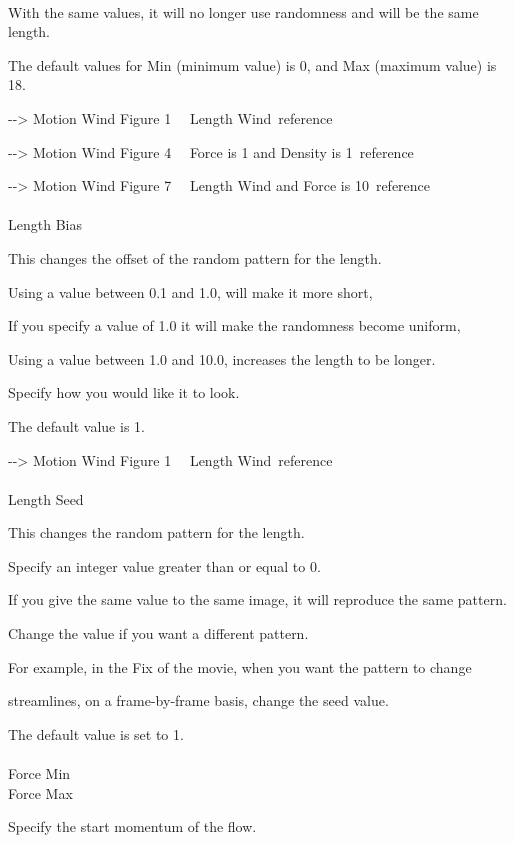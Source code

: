 \documentclass[a4paper,12pt]{article}
\begin{document}
\ \vspace{-0.2em}
\par
With the same values, it will no longer use randomness and will be the same length.\par
The default values for Min (minimum value) is 0, and Max (maximum value) is 18.\par
-{-}> \textquotedbl Motion Wind Figure 1 \ \ Length Wind\textquotedbl \ reference\par
-{-}> \textquotedbl Motion Wind Figure 4 \ \ Force is 1 and Density is 1\textquotedbl \ reference\par
-{-}> \textquotedbl Motion Wind Figure 7 \ \ Length Wind and Force is 10\textquotedbl \ reference\\
\\
Length Bias\par
This changes the offset of the random pattern for the length.\par
Using a value between 0.1 and 1.0, will make it more short,\par
If you specify a value of 1.0 it will make the randomness become uniform,\par
Using a value between 1.0 and 10.0, increases the length to be longer.\par
Specify how you would like it to look.\par
The default value is 1.\par
-{-}> \textquotedbl Motion Wind Figure 1 \ \ Length Wind\textquotedbl \ reference\\
\\
Length Seed\par
This changes the random pattern for the length.\par
Specify an integer value greater than or equal to 0.\par
If you give the same value to the same image, it will reproduce the same pattern.\par
Change the value if you want a different pattern.\par
For example, in the Fix of the movie, when you want the pattern to change\par
streamlines, on a frame-by-frame basis, change the seed value.\par
The default value is set to 1.\\
\\
Force Min\\
Force Max\par
Specify the start momentum of the flow.\par
\end{document}
